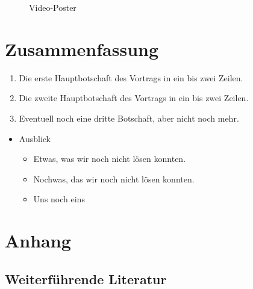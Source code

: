 \documentclass[12pt,ngerman]{scrartcl}
\begin{document}
\begin{figure}
  \caption{Video-Poster}
\end{figure}

\section*{Zusammenfassung}

\begin{enumerate}
\item Die erste Hauptbotschaft des Vortrags in ein bis zwei Zeilen.
\item Die zweite Hauptbotschaft des Vortrags in ein bis zwei Zeilen.
\item Eventuell noch eine dritte Botschaft, aber nicht noch mehr.
\end{enumerate}

\begin{itemize}
\item Ausblick
  \begin{itemize}
  \item Etwas, was wir noch nicht lösen konnten.
  \item Nochwas, das wir noch nicht lösen konnten.
  \item Uns noch eins
  \end{itemize}
\end{itemize}

\appendix
\section*{Anhang}

\subsection*{Weiterführende Literatur}

\printbibliography[title={Quellenverzeichnis}]
\end{document}
